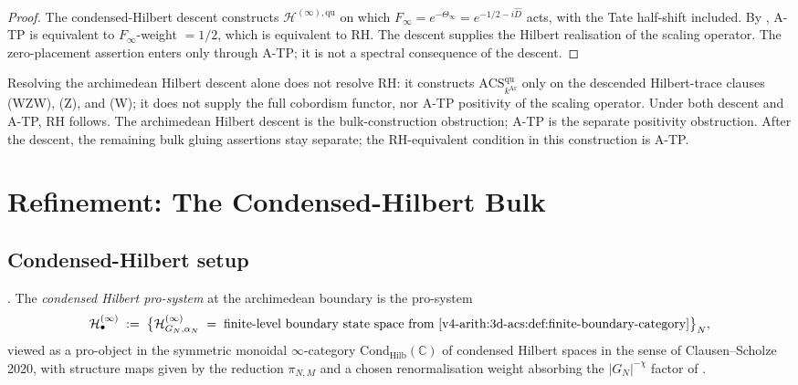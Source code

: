 \begin{proof}
The condensed-Hilbert descent constructs
\(\mathcal H^{(\infty),\mathrm{qu}}\) on which
\(F_{\infty}=e^{-\Theta_{\infty}}=e^{-1/2-i\widehat D}\) acts, with
the Tate half-shift included. By
, A-TP is
equivalent to \(F_{\infty}\)-weight \(=1/2\), which is equivalent to RH.
The descent supplies the Hilbert realisation of the scaling operator.
The zero-placement assertion enters only through A-TP; it is not a
spectral consequence of the descent.
\end{proof}

\begin{remark}
\label{v4-arith:w10-a:rem:what-resolves}
Resolving the archimedean Hilbert descent alone does not
resolve RH: it constructs
\(\mathrm{ACS}^{\mathrm{qu}}_{k^{\mathrm{Ar}}}\) only on the
descended Hilbert-trace clauses (WZW), (Z), and (W); it does not
supply the full cobordism functor, nor A-TP positivity
of the scaling operator. Under both descent and A-TP, RH follows.
The archimedean Hilbert descent is the bulk-construction
obstruction; A-TP is the separate positivity obstruction. After the
descent, the remaining bulk gluing assertions stay separate; the
RH-equivalent condition in this construction is A-TP.
\end{remark}

\section{Refinement: The Condensed-Hilbert Bulk}
\label{v4-arith:w10-a:condensed-bulk}

\subsection{Condensed-Hilbert setup}
\label{v4-arith:w10-a:condensed-setup}

\begin{definition}
\label{v4-arith:w10-a:def:condensed-pro-system}
\ClaimStatusDefinitional. The \emph{condensed Hilbert pro-system}
at the archimedean boundary is the pro-system
\[
\mathcal H^{(\infty)}_{\bullet}\;:=\;
\bigl\{
\mathcal H^{(\infty)}_{G_{N},\alpha_{N}}
\;=\;\text{finite-level boundary state space from}\ \Cref{v4-arith:3d-acs:def:finite-boundary-category}
\bigr\}_{N},
\]
viewed as a pro-object in the symmetric monoidal
\(\infty\)-category \(\mathrm{Cond}_{\mathrm{Hilb}}(\mathbb C)\) of
condensed Hilbert spaces in the sense of Clausen--Scholze 2020,
with structure maps given by the reduction \(\pi_{N,M}\) and a
chosen renormalisation weight absorbing the \(|G_{N}|^{-\chi}\)
factor of .
\end{definition}


